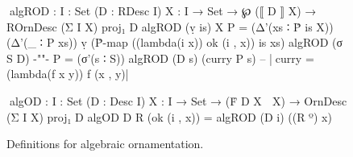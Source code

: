\begin{figure}
\codefigure
\begin{code}
^^^algROD :  {I : Set} (D : RDesc I) {X : I → Set} →
             ℘ (⟦ D ⟧ X) → ROrnDesc (Σ I X) proj₁ D
algROD (ṿ is)   {X}     P =  (Δ'(xs ∶ Ṗ is X)) (Δ'(_ ∶ P xs))
                               ṿ (Ṗ-map ((lambda({i} x)) ok (i , x)) is xs)
algROD (σ S D)  {-""-}  P =  (σ'(s ∶ S)) algROD (D s) (curry P s)
                               -- |^^^curry = (lambda(f x y)) f (x , y)|

^^^algOD :  {I : Set} (D : Desc I) {X : I → Set} →
            (Ḟ D X ↝ X) → OrnDesc (Σ I X) proj₁ D
algOD D R (ok (i , x)) = algROD (D i) ((R º) x)
\end{code}
\caption{Definitions for algebraic ornamentation.}
\label{fig:algOD}
\end{figure}

